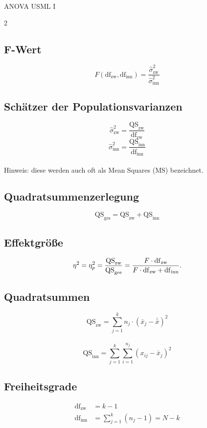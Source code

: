 \begin{formulaBox}{ANOVA US}{ML I}
\begin{multicols}{2}

\subsection*{F-Wert}
$$F(\mathrm{df}_{\mathrm{zw}},\mathrm{df}_{\mathrm{inn}})=\frac{\hat{\sigma}^2_{\mathrm{zw}}}{\hat{\sigma}^2_{\mathrm{inn}}}$$

\subsection*{Schätzer der Populationsvarianzen}
$$\hat{\sigma}^2_{\mathrm{zw}}=\frac{\mathrm{QS}_{\mathrm{zw}}}{\mathrm{df}_{\mathrm{zw}}}$$ $$\hat{\sigma}^2_{\mathrm{inn}}=\frac{\mathrm{QS}_{\mathrm{inn}}}{\mathrm{df}_{\mathrm{inn}}}$$\\
Hinweis: diese werden auch oft als Mean Squares (MS) bezeichnet.

\subsection*{Quadratsummenzerlegung}
$$\mathrm{QS}_{\mathrm{ges}}=\mathrm{QS}_{\mathrm{zw}}+\mathrm{QS}_{\mathrm{inn}}$$
\subsection*{Effektgröße}
\[
\eta^2=\eta_p^2=\frac{\mathrm{QS}_{\mathrm{zw}}}{\mathrm{QS}_{\mathrm{ges}}}
=\frac{F\cdot \mathrm{df}_{\mathrm{zw}}}{F\cdot \mathrm{df}_{\mathrm{zw}}+\mathrm{df}_{\mathrm{inn}}}.
\]

\subsection*{Quadratsummen}
$$\mathrm{QS}_{\mathrm{zw}}=\sum\limits_{j=1}^k n_j \cdot(\bar{x}_j-\bar{\bar{x}})^2$$\
$$\mathrm{QS}_{\mathrm{inn}}=\sum\limits_{j=1}^k \sum\limits_{i=1}^{n_j}(x_{ij}-\bar{x}_j)^2$$

\subsection*{Freiheitsgrade}
\begin{align*}
\mathrm{df}_{\mathrm{zw}}&=k-1\\
\mathrm{df}_{\mathrm{inn}}&=\sum\limits_{j=1}^k(n_j-1) = N-k
\end{align*}


\end{multicols}
\end{formulaBox}
